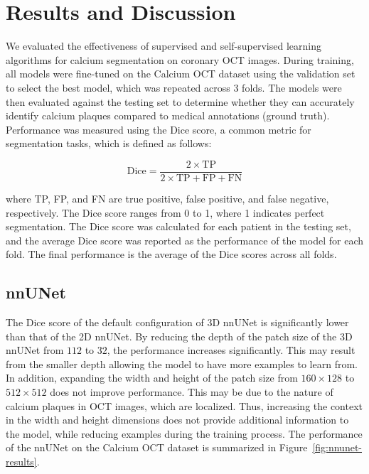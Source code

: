 \documentclass[a4paper,11pt,oneside]{report}
\begin{document}
\chapter{Results and Discussion}


We evaluated the effectiveness of supervised and self-supervised learning algorithms for calcium segmentation on coronary OCT images. During training, all models were fine-tuned on the Calcium OCT dataset using the validation set to select the best model, which was repeated across 3 folds. The models were then evaluated against the testing set to determine whether they can accurately identify calcium plaques compared to medical annotations (ground truth). Performance was measured using the Dice score, a common metric for segmentation tasks, which is defined as follows:

\begin{equation}
    \text{Dice} = \frac{2 \times \text{TP}}{2 \times \text{TP} + \text{FP} + \text{FN}}
\end{equation}

where TP, FP, and FN are true positive, false positive, and false negative, respectively. The Dice score ranges from 0 to 1, where 1 indicates perfect segmentation. The Dice score was calculated for each patient in the testing set, and the average Dice score was reported as the performance of the model for each fold. The final performance is the average of the Dice scores across all folds.

\section{nnUNet}\label{sec:result:nnunet}
The Dice score of the default configuration of 3D nnUNet is significantly lower than that of the 2D nnUNet. By reducing the depth of the patch size of the 3D nnUNet from $112$ to $32$, the performance increases significantly. This may result from the smaller depth allowing the model to have more examples to learn from. In addition, expanding the width and height of the patch size from $160\times 128$ to $512\times 512$ does not improve performance. This may be due to the nature of calcium plaques in OCT images, which are localized. Thus, increasing the context in the width and height dimensions does not provide additional information to the model, while reducing examples during the training process. The performance of the nnUNet on the Calcium OCT dataset is summarized in Figure~\ref{fig:nnunet-results}.
\end{document}
